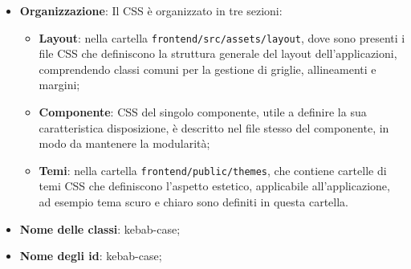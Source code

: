 \begin{itemize}
  \item \textbf{Organizzazione}: Il CSS è organizzato in tre sezioni:
  \begin{itemize}
    \item \textbf{Layout}: nella cartella \texttt{frontend/src/assets/layout}, dove sono presenti i file CSS che definiscono la struttura generale del layout dell'applicazioni, comprendendo classi comuni per la gestione di griglie, allineamenti e margini;
    \item \textbf{Componente}: CSS del singolo componente, utile a definire la sua caratteristica disposizione, è descritto nel file stesso del componente, in modo da mantenere la modularità;
    \item \textbf{Temi}: nella cartella \texttt{frontend/public/themes}, che contiene cartelle di temi CSS che definiscono l'aspetto estetico, applicabile all'applicazione, ad esempio tema scuro e chiaro sono definiti in questa cartella.
  \end{itemize}
  \item \textbf{Nome delle classi}: kebab-case;
  \item \textbf{Nome degli id}: kebab-case;
\end{itemize}